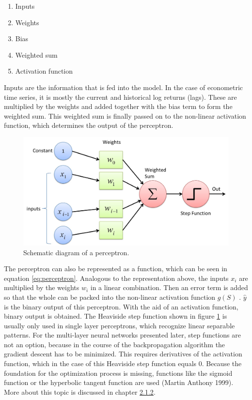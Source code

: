 \documentclass[
]{article}
\begin{document}
\begin{enumerate}
\def\labelenumi{\arabic{enumi}.}
\item
  Inputs
\item
  Weights
\item
  Bias
\item
  Weighted sum
\item
  Activation function
\end{enumerate}

Inputs are the information that is fed into the model. In the case of
econometric time series, it is mostly the current and historical log
returns (lags). These are multiplied by the weights and added together
with the bias term to form the weighted sum. This weighted sum is
finally passed on to the non-linear activation function, which
determines the output of the perceptron.

\newpage

\begin{figure}

{\centering \includegraphics[width=0.7\linewidth]{images/Perceptron} 

}

\caption{Schematic diagram of a perceptron.}\label{fig:perceptron_schema}
\end{figure}

The perceptron can also be represented as a function, which can be seen
in equation \ref{eq:perceptron}. Analogous to the representation above,
the inputs \(x_{i}\) are multiplied by the weights \(w_{i}\) in a linear
combination. Then an error term is added so that the whole can be packed
into the non-linear activation function \(g(S)\) . \(\hat{y}\) is the
binary output of this perceptron. With the aid of an activation
function, binary output is obtained. The Heaviside step function shown
in figure \ref{fig:perceptron_schema} is usually only used in single
layer perceptrons, which recognize linear separable patterns. For the
multi-layer neural networks presented later, step functions are not an
option, because in the course of the backpropagation algorithm the
gradient descent has to be minimized. This requires derivatives of the
activation function, which in the case of this Heaviside step function
equals 0. Because the foundation for the optimization process is
missing, functions like the sigmoid function or the hyperbolic tangent
function are used (Martin Anthony 1999). More about this topic is
discussed in chapter \protect\hyperlink{backprogation_algorithm}{2.1.2}.
\end{document}
